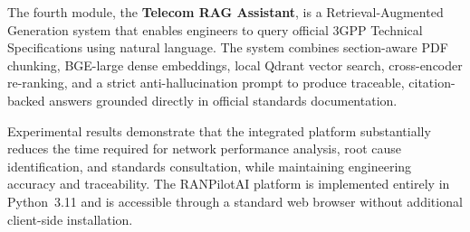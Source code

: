 The fourth module, the \textbf{Telecom RAG Assistant}, is a Retrieval-Augmented Generation system that enables engineers to query official 3GPP Technical Specifications using natural language. The system combines section-aware PDF chunking, BGE-large dense embeddings, local Qdrant vector search, cross-encoder re-ranking, and a strict anti-hallucination prompt to produce traceable, citation-backed answers grounded directly in official standards documentation.

Experimental results demonstrate that the integrated platform substantially reduces the time required for network performance analysis, root cause identification, and standards consultation, while maintaining engineering accuracy and traceability. The RANPilotAI platform is implemented entirely in Python~3.11 and is accessible through a standard web browser without additional client-side installation.

\clearpage
